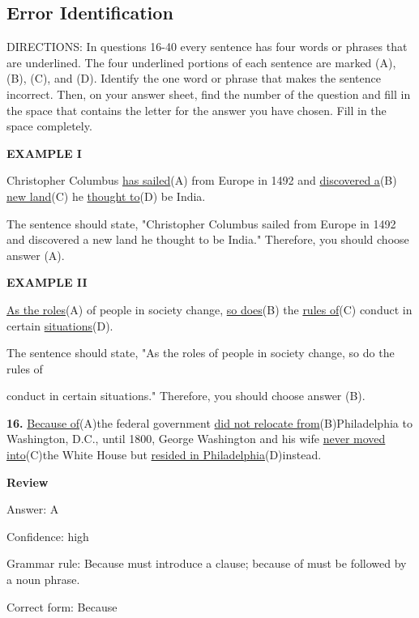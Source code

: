 \documentclass[12pt]{article}
\begin{document}
\subsection*{Error Identification}
DIRECTIONS: In questions 16-40 every sentence has four words or phrases that are underlined. The four underlined portions of each sentence are marked (A), (B), (C), and (D). Identify the one word or phrase that makes the sentence incorrect. Then, on your answer sheet, find the number of the question and fill in the space that contains the letter for the answer you have chosen. Fill in the space completely.\par
\begin{exampleblock}
\textbf{EXAMPLE I}\par
Christopher Columbus \uline{has sailed}(A) from Europe in 1492 and \uline{discovered a}(B) \uline{new land}(C) he \uline{thought to}(D) be India.\par
The sentence should state, "Christopher Columbus sailed from Europe in 1492 and discovered a new land he thought to be India." Therefore, you should choose answer (A).\par
\end{exampleblock}
\begin{exampleblock}
\textbf{EXAMPLE II}\par
\uline{As the roles}(A) of people in society change, \uline{so does}(B) the \uline{rules of}(C) conduct in certain \uline{situations}(D).\par
The sentence should state, "As the roles of people in society change, so do the rules of\par
conduct in certain situations." Therefore, you should choose answer (B).\par
\end{exampleblock}
\noindent\textbf{16.} \uline{Because of}(A)the federal government \uline{did not relocate from}(B)Philadelphia to Washington, D.C., until 1800, George Washington and his wife \uline{never moved into}(C)the White House but \uline{resided in Philadelphia}(D)instead.
\par
\begingroup
\setlength{\parskip}{0pt}
\setlength{\parindent}{0pt}
\textbf{Review}\par
Answer: A\par
Confidence: high\par
Grammar rule: Because must introduce a clause; because of must be followed by a noun phrase.\par
Correct form: Because\par
\end{document}
